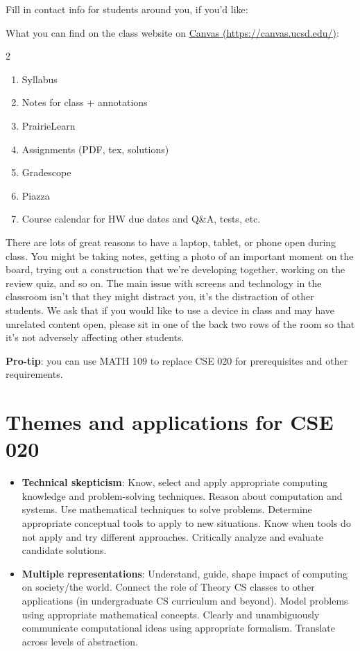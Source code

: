 Fill in contact info for students around you, if you'd like:

\vfill
\vfill

What you can find on the class website on \href{https://canvas.ucsd.edu/}{Canvas (https://canvas.ucsd.edu/)}:

\begin{multicols}{2}
\begin{enumerate}
\item Syllabus
\item Notes for class + annotations
\item PrairieLearn
\item Assignments (PDF, tex, solutions)
\item Gradescope
\item Piazza
\item Course calendar for HW due dates and Q\&A, tests, etc.
\end{enumerate}
\end{multicols}

\vfill
There are lots of great reasons to have a laptop, tablet, or phone open during class. You might be taking notes, 
getting a photo of an important moment on the board, trying out a construction that we're developing together, working 
on the review quiz, and so on. 
The main issue with screens and technology in the classroom isn't that they might 
distract you, 
it's the distraction of other students. We ask that if you would like to use
a device in class and may 
have unrelated content open, please sit in one of the back two rows of the 
room so that it's not adversely affecting other students.

\vfill

{\bf Pro-tip}: you can use MATH 109 to replace CSE 020 for prerequisites and other requirements.

\vfill

\section*{Themes and applications for CSE 020}
\begin{itemize}
\item {\bf Technical skepticism}: Know, select and apply appropriate computing knowledge and problem-solving techniques. 
Reason about computation and systems. 
Use mathematical techniques to solve problems. 
Determine appropriate conceptual tools to apply to new situations. 
Know when tools do not apply and try different approaches. 
Critically analyze and evaluate candidate solutions.
\item {\bf Multiple representations}: Understand, guide, shape impact of computing on society/the world. 
Connect the role of Theory CS classes to other applications (in undergraduate CS curriculum and beyond). 
Model problems using appropriate mathematical concepts.
Clearly and unambiguously communicate computational ideas using appropriate formalism. 
Translate across levels of abstraction.
\end{itemize}

